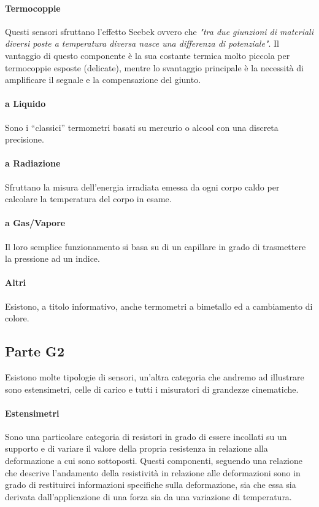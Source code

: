 \documentclass[12pt]{article}
\begin{document}
\paragraph{Termocoppie} Questi sensori sfruttano l'effetto Seebek ovvero che \textit{"tra due giunzioni di materiali diversi poste a temperatura diversa nasce una differenza di potenziale"}. Il vantaggio di questo componente è la sua costante termica molto piccola per termocoppie esposte (delicate), mentre lo svantaggio principale è la necessità di amplificare il segnale e la compensazione del giunto.

\paragraph{a Liquido} Sono i ``classici'' termometri basati su mercurio o alcool con una discreta precisione.

\paragraph{a Radiazione} Sfruttano la misura dell'energia irradiata emessa da ogni corpo caldo per calcolare la temperatura del corpo in esame.

\paragraph{a Gas/Vapore} Il loro semplice funzionamento si basa su di un capillare in grado di trasmettere la pressione ad un indice.

\paragraph{Altri} Esistono, a titolo informativo, anche termometri a bimetallo ed a cambiamento di colore.

\subsection{Parte G2}\label{g2} %
Esistono molte tipologie di sensori, un'altra categoria che andremo ad illustrare sono estensimetri, celle di carico e tutti i misuratori di grandezze cinematiche.

\paragraph{Estensimetri} Sono una particolare categoria di resistori in grado di essere incollati su un supporto e di variare il valore della propria resistenza in relazione alla deformazione a cui sono sottoposti. Questi componenti, seguendo una relazione che descrive l'andamento della resistività in relazione alle deformazioni sono in grado di restituirci informazioni specifiche sulla deformazione, sia che essa sia derivata dall'applicazione di una forza sia da una variazione di temperatura.
\end{document}
